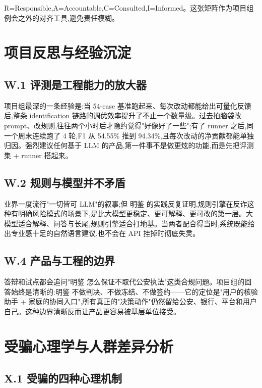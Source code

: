 \documentclass[UTF8,a4paper,12pt]{ctexart}
\begin{document}
R=Responsible,A=Accountable,C=Consulted,I=Informed。这张矩阵作为项目组例会之外的对齐工具,避免责任模糊。

\section{项目反思与经验沉淀}

\subsection*{W.1 评测是工程能力的放大器}

项目组最深的一条经验是:当 54-case 基准跑起来、每次改动都能给出可量化反馈后,整条 identification 链路的调优效率提升了不止一个数量级。过去拍脑袋改 prompt、改规则,往往两个小时后才隐约觉得"好像好了一些";有了 runner 之后,同一个周末连续跑了 4 轮,F1 从 54.55\% 推到 94.34\%,且每次改动的净贡献都能单独归因。强烈建议任何基于 LLM 的产品,第一件事不是做更炫的功能,而是先把评测集 + runner 搭起来。

\subsection*{W.2 规则与模型并不矛盾}

业界一度流行"一切皆可 LLM"的叙事;但 明鉴 的实践反复证明,规则引擎在反诈这种有明确风险模式的场景下,是比大模型更稳定、更可解释、更可改的第一层。大模型适合解释、问答与长尾,规则引擎适合打地基。当两者配合得当时,系统既能给出专业感十足的自然语言建议,也不会在 API 挂掉时彻底失灵。

\subsection*{W.4 产品与工程的边界}

答辩和试点都会追问"明鉴 怎么保证不取代公安执法"这类合规问题。项目组的回答始终是清晰的:明鉴 不做判决、不做冻结、不做签约——它的定位是"用户的核验助手 + 家庭的协同入口",所有真正的"决策动作"仍然留给公安、银行、平台和用户自己。这种边界清晰反而让产品更容易被基层单位接受。

\section{受骗心理学与人群差异分析}

\subsection*{X.1 受骗的四种心理机制}
\end{document}
